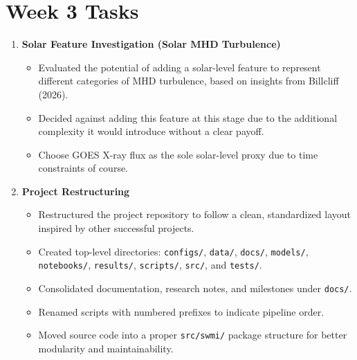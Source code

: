 \documentclass{article}
\begin{document}
\pagestyle{fancy}

\section*{Week 3 Tasks}

\begin{enumerate}

  \item \textbf{Solar Feature Investigation (Solar MHD Turbulence)}
  \begin{itemize}
    \item Evaluated the potential of adding a solar-level feature to represent different categories of MHD turbulence, based on insights from Billcliff (2026).
    \item Decided against adding this feature at this stage due to the additional complexity it would introduce without a clear payoff.
    \item Choose GOES X-ray flux as the sole solar-level proxy due to time constraints of course.
  \end{itemize}

  \item \textbf{Project Restructuring}
  \begin{itemize}
    \item Restructured the project repository to follow a clean, standardized layout inspired by other successful projects.
    \item Created top-level directories: \texttt{configs/}, \texttt{data/}, \texttt{docs/}, \texttt{models/}, \texttt{notebooks/}, \texttt{results/}, \texttt{scripts/}, \texttt{src/}, and \texttt{tests/}.
    \item Consolidated documentation, research notes, and milestones under \texttt{docs/}.
    \item Renamed scripts with numbered prefixes to indicate pipeline order.
    \item Moved source code into a proper \texttt{src/swmi/} package structure for better modularity and maintainability.
  \end{itemize}


\end{enumerate}
\end{document}
